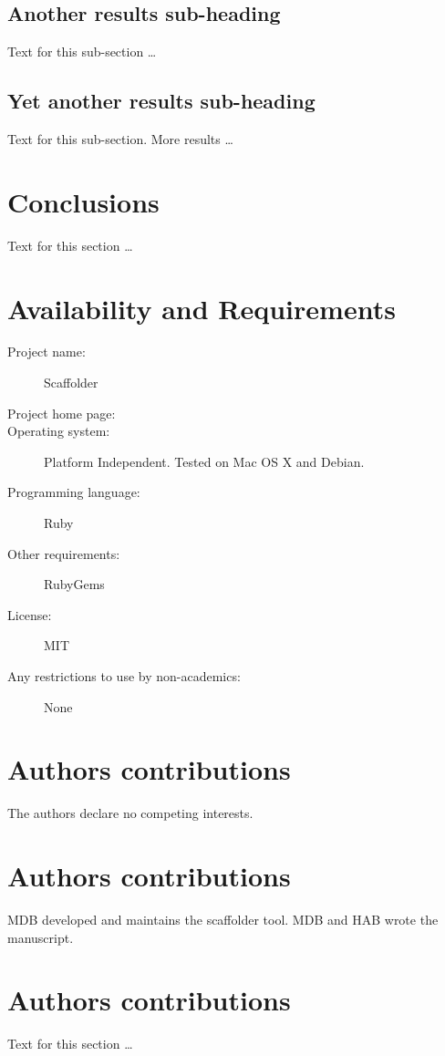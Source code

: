 \documentclass[10pt]{bmc_article}
\newenvironment{bmcformat}{\begin{raggedright}\baselineskip20pt\sloppy\setboolean{publ}{false}}{\end{raggedright}\baselineskip20pt\sloppy}
\begin{document}
\begin{bmcformat}
  \subsection*{Another results sub-heading}
    Text for this sub-section \ldots

  \subsection*{Yet another results sub-heading}
    Text for this sub-section.  More results \ldots
\section*{Conclusions}
  Text for this section \ldots
\section*{Availability and Requirements}

  \begin{description}
    \item[Project name:] Scaffolder
    \item[Project home page:] \scaffolder
    \item[Operating system:] Platform Independent. Tested on Mac OS X and
    Debian.
    \item[Programming language:] Ruby
    \item[Other requirements:] RubyGems
    \item[License:] MIT
    \item[Any restrictions to use by non-academics:] None
  \end{description}

\section*{Authors contributions}
  The authors declare no competing interests.
\section*{Authors contributions}

MDB developed and maintains the scaffolder tool. MDB and HAB wrote the
manuscript.

\section*{Authors contributions}
    Text for this section \ldots

\end{bmcformat}
\end{document}
